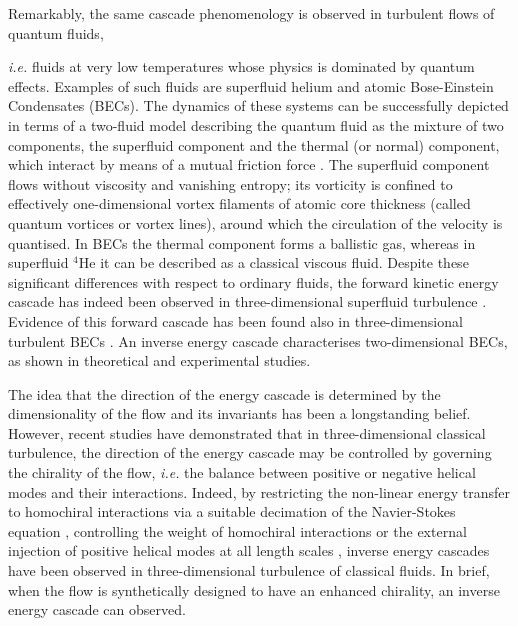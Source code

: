 \documentclass[%
 reprint,
 amsmath,amssymb,
 aps,
 prl,
]{revtex4-2}
\begin{document}
Remarkably, the same cascade phenomenology is observed in turbulent flows 
of quantum fluids, {\textit{i.e.} fluids at very low temperatures whose physics is
dominated by quantum effects.
Examples of such fluids are superfluid helium 
and atomic Bose-Einstein Condensates (BECs). 
The dynamics of these systems can be successfully depicted in terms of 
a two-fluid model \cite{tisza-1938,landau-1949,skrbek-sreenivasan-2012} 
describing the quantum fluid as the mixture of two components, 
the superfluid component and the thermal (or normal) component, which 
interact by means of a mutual friction force 
\cite{jackson-etal-2009,hall-vinen-1956a,hall-vinen-1956b}. 
The superfluid component flows without viscosity and
vanishing entropy; its vorticity is
confined to effectively one-dimensional vortex filaments
of atomic core thickness (called quantum vortices or vortex lines), 
around which the circulation of the velocity is quantised.
In BECs the thermal component forms a ballistic gas,
whereas in superfluid $^4$He it can be described as
a classical viscous fluid.
Despite these significant differences with respect to ordinary fluids, 
the forward kinetic energy cascade has
indeed been observed in three-dimensional superfluid
turbulence 
\cite{maurer1998,salort2010turbulent,baggaley2012,sherwin-robson2015}.
Evidence of this forward cascade has been found also in
three-dimensional turbulent BECs \cite{middleton-spencer2022}.
An inverse energy cascade characterises two-dimensional BECs, 
as shown in theoretical \cite{bradley2012energy,reeves2013,simula2014emergence} and experimental \cite{johnstone2019evolution,gauthier2019giant} studies.

The idea that the direction of the energy cascade is determined 
by the dimensionality of the flow and its invariants has been a 
longstanding belief. However, recent studies have demonstrated that 
in three-dimensional classical turbulence, the direction of the energy 
cascade may be controlled by governing the chirality of the 
flow, \textit{i.e.} the balance between 
positive or negative helical modes \cite{moffatt1969} and their interactions. 
Indeed, by restricting the non-linear energy transfer to homochiral interactions via a suitable decimation of the Navier-Stokes equation 
\cite{biferaleInverseEnergyCascade2012a,biferale-etal-2013}, controlling the weight of homochiral interactions \cite{sahoo-etal-2017} or the external injection 
of positive helical modes at all length scales \cite{plunianInverseCascadeEnergy2020a}, inverse energy cascades have been observed in three-dimensional turbulence
of classical fluids. In brief, when the flow is synthetically designed to have an enhanced chirality, an inverse energy cascade can observed.

}
\end{document}
